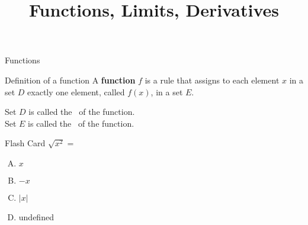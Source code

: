 \documentclass{beamer}
\begin{document}

\title{Functions, Limits, Derivatives}
\author{}
\date{}

\begin{frame}
  \titlepage
\end{frame}

\begin{frame}[t]{Functions}\vspace{4pt}
  \begin{block}{Definition of a function}
    \vspace{4pt}
    A \textbf{function} $f$ is a rule that assigns to each element $x$ in a set $D$ exactly one element, called $f(x)$, in a set $E$.
    \vspace{4pt}
  \end{block}

  Set $D$ is called the
  \, of the function.\\[10pt]
  Set $E$ is called the
  \, of the function.
\end{frame}

\begin{frame}[t]{Flash Card} \vspace{4pt}
  $\sqrt{x^{2}}=$\\ \vspace{10pt}
  \begin{enumerate}[(A)]
  \item $x$
  \item $-x$
  \item $|x|$
  \item undefined
  \end{enumerate}

\end{frame}
\end{document}
